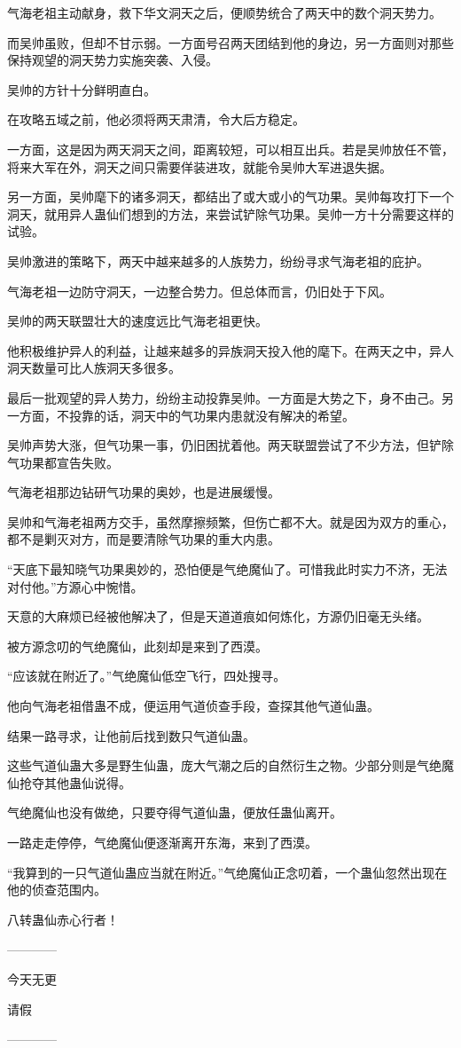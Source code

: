 \begin{this_body}
气海老祖主动献身，救下华文洞天之后，便顺势统合了两天中的数个洞天势力。

而吴帅虽败，但却不甘示弱。一方面号召两天团结到他的身边，另一方面则对那些保持观望的洞天势力实施突袭、入侵。

吴帅的方针十分鲜明直白。

在攻略五域之前，他必须将两天肃清，令大后方稳定。

一方面，这是因为两天洞天之间，距离较短，可以相互出兵。若是吴帅放任不管，将来大军在外，洞天之间只需要佯装进攻，就能令吴帅大军进退失据。

另一方面，吴帅麾下的诸多洞天，都结出了或大或小的气功果。吴帅每攻打下一个洞天，就用异人蛊仙们想到的方法，来尝试铲除气功果。吴帅一方十分需要这样的试验。

吴帅激进的策略下，两天中越来越多的人族势力，纷纷寻求气海老祖的庇护。

气海老祖一边防守洞天，一边整合势力。但总体而言，仍旧处于下风。

吴帅的两天联盟壮大的速度远比气海老祖更快。

他积极维护异人的利益，让越来越多的异族洞天投入他的麾下。在两天之中，异人洞天数量可比人族洞天多很多。

最后一批观望的异人势力，纷纷主动投靠吴帅。一方面是大势之下，身不由己。另一方面，不投靠的话，洞天中的气功果内患就没有解决的希望。

吴帅声势大涨，但气功果一事，仍旧困扰着他。两天联盟尝试了不少方法，但铲除气功果都宣告失败。

气海老祖那边钻研气功果的奥妙，也是进展缓慢。

吴帅和气海老祖两方交手，虽然摩擦频繁，但伤亡都不大。就是因为双方的重心，都不是剿灭对方，而是要清除气功果的重大内患。

“天底下最知晓气功果奥妙的，恐怕便是气绝魔仙了。可惜我此时实力不济，无法对付他。”方源心中惋惜。

天意的大麻烦已经被他解决了，但是天道道痕如何炼化，方源仍旧毫无头绪。

被方源念叨的气绝魔仙，此刻却是来到了西漠。

“应该就在附近了。”气绝魔仙低空飞行，四处搜寻。

他向气海老祖借蛊不成，便运用气道侦查手段，查探其他气道仙蛊。

结果一路寻求，让他前后找到数只气道仙蛊。

这些气道仙蛊大多是野生仙蛊，庞大气潮之后的自然衍生之物。少部分则是气绝魔仙抢夺其他蛊仙说得。

气绝魔仙也没有做绝，只要夺得气道仙蛊，便放任蛊仙离开。

一路走走停停，气绝魔仙便逐渐离开东海，来到了西漠。

“我算到的一只气道仙蛊应当就在附近。”气绝魔仙正念叨着，一个蛊仙忽然出现在他的侦查范围内。

八转蛊仙赤心行者！

------------

今天无更

请假

------------

\end{this_body}

